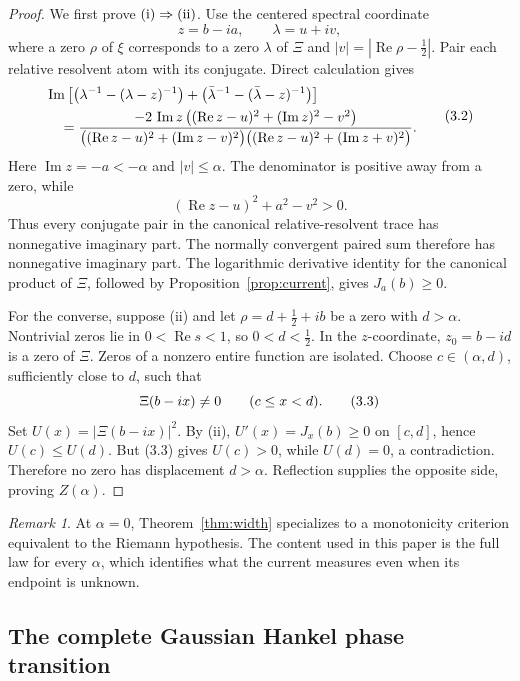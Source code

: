 \documentclass[11pt]{article}
\theoremstyle{definition}
\theoremstyle{remark}
\newtheorem{remark}[theorem]{Remark}
\newcommand{\Rea}{\operatorname{Re}}
\newcommand{\Ima}{\operatorname{Im}}
\newcommand{\eqtag}[1]{\qquad\text{\upshape(#1)}}
\begin{document}
\begin{proof}
We first prove \(\textup{(i)}\Rightarrow\textup{(ii)}\).
Use the centered spectral coordinate
\[
  z=b-ia,\qquad \lambda=u+iv,
\]
where a zero \(\rho\) of \(\xi\) corresponds to a zero \(\lambda\)
of \(\Xi\) and \(|v|=|\Rea\rho-\frac12|\).  Pair each relative
resolvent atom with its conjugate.  Direct calculation gives
\[
\begin{aligned}
&\Ima\left[
 \left(\lambda^{-1}-(\lambda-z)^{-1}\right)
 +\left(\bar\lambda^{-1}-(\bar\lambda-z)^{-1}\right)
\right]\\
&\quad =
\frac{-2\,\Ima z\,
 \big((\Rea z-u)^2+(\Ima z)^2-v^2\big)}
 {\big((\Rea z-u)^2+(\Ima z-v)^2\big)
  \big((\Rea z-u)^2+(\Ima z+v)^2\big)}.
\end{aligned}
\eqtag{3.2}
\]
Here \(\Ima z=-a<-\alpha\) and \(|v|\leq\alpha\).
The denominator is positive away from a zero, while
\[
  (\Rea z-u)^2+a^2-v^2>0.
\]
Thus every conjugate pair in the canonical relative-resolvent trace
has nonnegative imaginary part.  The normally convergent paired sum
therefore has nonnegative imaginary part.  The logarithmic derivative
identity for the canonical product of \(\Xi\), followed by
Proposition~\ref{prop:current}, gives \(J_a(b)\geq0\).

For the converse, suppose (ii) and let
\(\rho=d+\frac12+ib\) be a zero with \(d>\alpha\).
Nontrivial zeros lie in \(0<\Rea s<1\), so \(0<d<\frac12\).
In the \(z\)-coordinate, \(z_0=b-id\) is a zero of \(\Xi\).
Zeros of a nonzero entire function are isolated.  Choose
\(c\in(\alpha,d)\), sufficiently close to \(d\), such that
\[
  \Xi(b-ix)\neq0\qquad(c\leq x<d).                   \eqtag{3.3}
\]
Set \(U(x)=|\Xi(b-ix)|^2\).  By (ii),
\(
U'(x)=J_x(b)\geq0
\)
on \([c,d]\), hence \(U(c)\leq U(d)\).  But (3.3) gives
\(U(c)>0\), while \(U(d)=0\), a contradiction.  Therefore no zero
has displacement \(d>\alpha\).  Reflection supplies the opposite
side, proving \(Z(\alpha)\).
\end{proof}

\begin{remark}
At \(\alpha=0\), Theorem~\ref{thm:width} specializes to a
monotonicity criterion equivalent to the Riemann hypothesis.  The
content used in this paper is the full law for every \(\alpha\), which
identifies what the current measures even when its endpoint is unknown.
\end{remark}

\subsection{The complete Gaussian Hankel phase transition}
\end{document}
